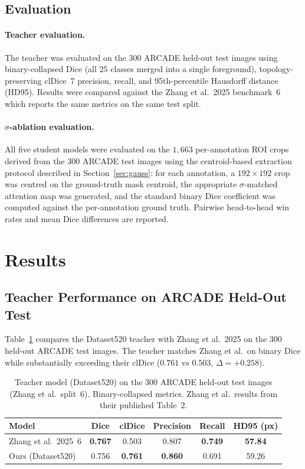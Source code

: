 \documentclass[12pt]{article}
\begin{document}
\subsection{Evaluation}

\paragraph{Teacher evaluation.}
The teacher was evaluated on the 300 ARCADE held-out test images using
binary-collapsed Dice (all 25 classes merged into a single foreground),
topology-preserving clDice~7 precision, recall, and 95th-percentile Hausdorff
distance (HD95). Results were compared against the Zhang et al.\ 2025
benchmark~6 which reports the same metrics on the same test split.

\paragraph{$\sigma$-ablation evaluation.}
All five student models were evaluated on the $1{,}663$ per-annotation ROI
crops derived from the 300 ARCADE test images using the centroid-based
extraction protocol described in Section~\ref{sec:gauss}: for each annotation,
a $192\times192$ crop was centred on the ground-truth mask centroid, the
appropriate $\sigma$-matched attention map was generated, and the standard
binary Dice coefficient was computed against the per-annotation ground truth.
Pairwise head-to-head win rates and mean Dice differences are reported.

\section{Results}

\subsection{Teacher Performance on ARCADE Held-Out Test}

Table~\ref{tab:teacher} compares the Dataset520 teacher with Zhang et al.\ 2025
on the 300 held-out ARCADE test images. The teacher matches Zhang et al.\ on
binary Dice while substantially exceeding their clDice ($0.761$ vs $0.503$,
$\Delta{=}{+}0.258$).

\begin{table}[!htb]
\centering
\caption{Teacher model (Dataset520) on the 300 ARCADE held-out test images
(Zhang et al.\ split~6). Binary-collapsed metrics. Zhang et al.\ results from
their published Table~2.}
\label{tab:teacher}
\begin{tabular}{lccccc}
\toprule
\textbf{Model} & \textbf{Dice} & \textbf{clDice} & \textbf{Precision} & \textbf{Recall} & \textbf{HD95 (px)} \\
\midrule
Zhang et al.\ 2025~6 & \textbf{0.767} & 0.503 & 0.807 & \textbf{0.749} & \textbf{57.84} \\
Ours (Dataset520)    & 0.756 & \textbf{0.761} & \textbf{0.860} & 0.691 & 59.26 \\
\bottomrule
\end{tabular}
\end{table}
\end{document}
